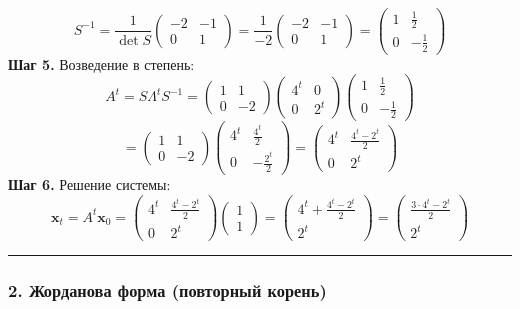 $$S^{-1} = \frac{1}{\det S}\begin{pmatrix} -2 & -1 \\ 0 & 1 \end{pmatrix} = \frac{1}{-2}\begin{pmatrix} -2 & -1 \\ 0 & 1 \end{pmatrix} = \begin{pmatrix} 1 & \frac{1}{2} \\ 0 & -\frac{1}{2} \end{pmatrix}$$
\textbf{Шаг 5.} Возведение в степень:
$$A^t = S\Lambda^t S^{-1} = \begin{pmatrix} 1 & 1 \\ 0 & -2 \end{pmatrix}\begin{pmatrix} 4^t & 0 \\ 0 & 2^t \end{pmatrix}\begin{pmatrix} 1 & \frac{1}{2} \\ 0 & -\frac{1}{2} \end{pmatrix}$$
$$= \begin{pmatrix} 1 & 1 \\ 0 & -2 \end{pmatrix}\begin{pmatrix} 4^t & \frac{4^t}{2} \\ 0 & -\frac{2^t}{2} \end{pmatrix} = \begin{pmatrix} 4^t & \frac{4^t - 2^t}{2} \\ 0 & 2^t \end{pmatrix}$$
\textbf{Шаг 6.} Решение системы:
$$\mathbf{x}_t = A^t\mathbf{x}_0 = \begin{pmatrix} 4^t & \frac{4^t - 2^t}{2} \\ 0 & 2^t \end{pmatrix}\begin{pmatrix} 1 \\ 1 \end{pmatrix} = \begin{pmatrix} 4^t + \frac{4^t - 2^t}{2} \\ 2^t \end{pmatrix} = \begin{pmatrix} \frac{3 \cdot 4^t - 2^t}{2} \\ 2^t \end{pmatrix}$$

\bigskip
\hrule
\bigskip

\subsubsection*{2. Жорданова форма (повторный корень)}

